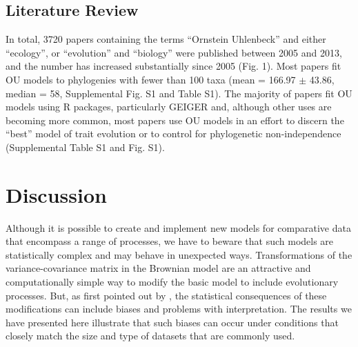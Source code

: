 \documentclass[a4paper,12pt]{article}
\begin{document}
\subsection{Literature Review}
\label{section:literature.results}
In total, 3720 papers containing the terms “Ornstein Uhlenbeck” and either “ecology”, or “evolution” and “biology” were published between 2005 and 2013, and the number has increased substantially since 2005 (Fig. 1). Most papers fit OU models to phylogenies with fewer than 100 taxa (mean = 166.97 $\pm$ 43.86, median = 58, Supplemental Fig. S1 and Table S1). The majority of papers fit OU models using R packages, particularly GEIGER and, although other uses are becoming more common, most papers use OU models in an effort to discern the “best” model of trait evolution or to control for phylogenetic non-independence (Supplemental Table S1 and Fig. S1). 
 
\section{Discussion}
\label{section:discussion}
Although it is possible to create and implement new models for comparative data that encompass a range of processes, we have to beware that such models are statistically complex and may behave in unexpected ways. Transformations of the variance-covariance matrix in the Brownian model are an attractive and computationally simple way to modify the basic model to include evolutionary processes. But, as first pointed out by \citet{grafen1989phylogenetic}, the statistical consequences of these modifications can include biases and problems with interpretation. The results we have presented here illustrate that such biases can occur under conditions that closely match the size and type of datasets that are commonly used. 
\end{document}
